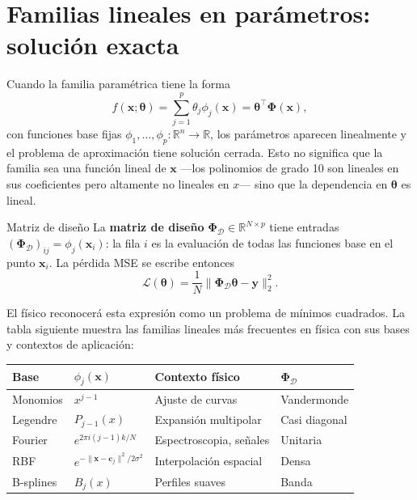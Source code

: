 \section{Familias lineales en parámetros: solución exacta}
\label{sec:lineales}


Cuando la familia paramétrica tiene la forma
\begin{equation}
  f(\bm{x};\bm{\theta}) = \sum_{j=1}^p \theta_j \phi_j(\bm{x})
  = \bm{\theta}^\top \bm{\Phi}(\bm{x}),
  \label{eq:familia_lineal}
\end{equation}
con funciones base fijas $\phi_1, \ldots, \phi_p: \mathbb{R}^n \to
\mathbb{R}$, los parámetros aparecen linealmente y el problema de
aproximación tiene solución cerrada. Esto no significa que la familia
sea una función lineal de $\bm{x}$ —los polinomios de grado 10 son
lineales en sus coeficientes pero altamente no lineales en $x$— sino
que la dependencia en $\bm{\theta}$ es lineal.

\begin{definicion}{Matriz de diseño}
\label{def:diseño}
La \textbf{matriz de diseño} $\bm{\Phi}_{\mathcal{D}} \in
\mathbb{R}^{N \times p}$ tiene entradas
$(\bm{\Phi}_{\mathcal{D}})_{ij} = \phi_j(\bm{x}_i)$: la fila $i$ es
la evaluación de todas las funciones base en el punto $\bm{x}_i$. La
pérdida MSE se escribe entonces
\begin{equation}
  \mathcal{L}(\bm{\theta})
  = \frac{1}{N}\|\bm{\Phi}_{\mathcal{D}}\bm{\theta} - \bm{y}\|_2^2.
  \label{eq:loss_mse_matricial}
\end{equation}
\end{definicion}

El físico reconocerá esta expresión como un problema de mínimos cuadrados.
La tabla siguiente muestra las familias lineales más frecuentes en física
con sus bases y contextos de aplicación:

\begin{center}
\begin{tabular}{llll}
\toprule
\textbf{Base} & $\phi_j(\bm{x})$ & \textbf{Contexto físico} &
$\bm{\Phi}_{\mathcal{D}}$ \\
\midrule
Monomios & $x^{j-1}$ & Ajuste de curvas & Vandermonde \\
Legendre & $P_{j-1}(x)$ & Expansión multipolar & Casi diagonal \\
Fourier  & $e^{2\pi i (j-1) k/N}$ & Espectroscopia, señales & Unitaria \\
RBF      & $e^{-\|\bm{x}-\bm{c}_j\|^2/2\sigma^2}$ &
  Interpolación espacial & Densa \\
B-splines & $B_j(x)$ & Perfiles suaves & Banda \\
\bottomrule
\end{tabular}
\end{center}

